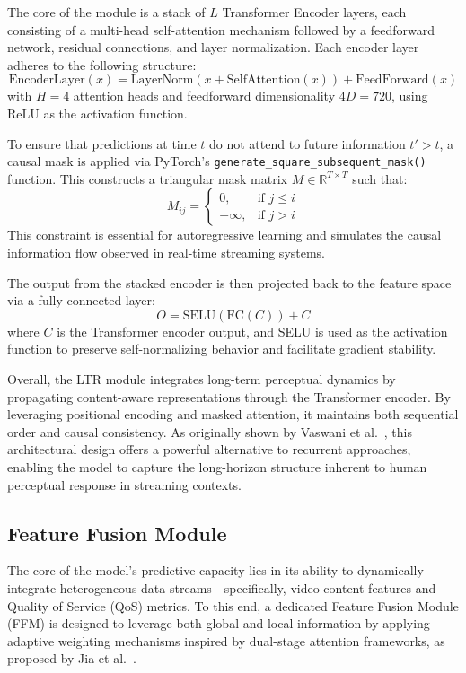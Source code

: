 The core of the module is a stack of $L$ Transformer Encoder layers, each consisting of a multi-head self-attention mechanism followed by a feedforward network, residual connections, and layer normalization. Each encoder layer adheres to the following structure:
\[
\text{EncoderLayer}(x) = \text{LayerNorm}(x + \text{SelfAttention}(x)) + \text{FeedForward}(x)
\]
with $H = 4$ attention heads and feedforward dimensionality $4D = 720$, using ReLU as the activation function.

To ensure that predictions at time $t$ do not attend to future information $t' > t$, a causal mask is applied via PyTorch's \texttt{generate\_square\_subsequent\_mask()} function. This constructs a triangular mask matrix $M \in \mathbb{R}^{T \times T}$ such that:
\[
M_{ij} =
\begin{cases}
0, & \text{if } j \leq i \\
-\infty, & \text{if } j > i
\end{cases}
\]
This constraint is essential for autoregressive learning and simulates the causal information flow observed in real-time streaming systems.

The output from the stacked encoder is then projected back to the feature space via a fully connected layer:
\[
O = \text{SELU}(\text{FC}(C)) + C
\]
where $C$ is the Transformer encoder output, and SELU is used as the activation function to preserve self-normalizing behavior and facilitate gradient stability.

Overall, the LTR module integrates long-term perceptual dynamics by propagating content-aware representations through the Transformer encoder. By leveraging positional encoding and masked attention, it maintains both sequential order and causal consistency. As originally shown by Vaswani et al.~\cite{vaswani2017attention}, this architectural design offers a powerful alternative to recurrent approaches, enabling the model to capture the long-horizon structure inherent to human perceptual response in streaming contexts.

\subsection{Feature Fusion Module}

The core of the model's predictive capacity lies in its ability to dynamically integrate heterogeneous data streams—specifically, video content features and Quality of Service (QoS) metrics. To this end, a dedicated Feature Fusion Module (FFM) is designed to leverage both global and local information by applying adaptive weighting mechanisms inspired by dual-stage attention frameworks, as proposed by Jia et al.~\cite{jia2024continuous}.

